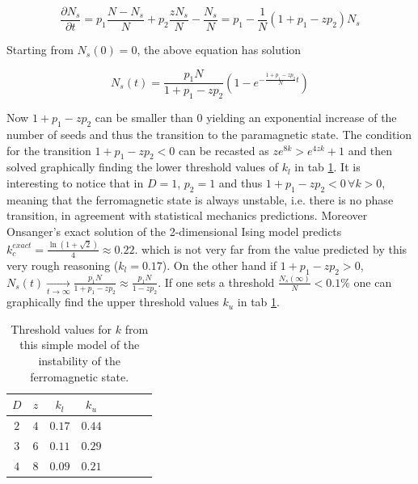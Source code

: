 \documentclass[a4paper, 11pt]{article}
\begin{document}
      \begin{equation*}
        \frac{\partial N_{s}}{\partial t} = p_1\frac{N - N_{s}}{N}  + p_2 \frac{zN_s}{N}- \frac{N_{s}}{N} = p_1 - \frac{1}{N}(1 + p_1 - zp_2) N_s
      \end{equation*}

      Starting from $N_s(0) = 0$, the above equation has solution

      \begin{equation*}
        N_{s}(t) = \frac{p_1N}{1 + p_1 - zp_2}\left(1 - e^{-\frac{1 + p_1 -zp_2}{N}t}  \right)
      \end{equation*}

      Now $1 + p_1 - zp_2$ can be smaller than 0 yielding an exponential increase of the number of seeds and thus the transition to the paramagnetic state. The condition for the transition $1 + p_1 - zp_2 < 0$ can be recasted as $ze^{8k} > e^{4zk} + 1$ and then solved graphically finding the lower threshold values of $k_l$ in tab \ref{tab:k_crit_th}.
      It is interesting to notice that in $D = 1$, $p_2 = 1$ and thus $1 + p_1 - zp_2 < 0 \, \forall k > 0$, meaning that the ferromagnetic state is always unstable, i.e. there is no phase transition, in agreement with statistical mechanics predictions. Moreover Onsanger's exact solution of the 2-dimensional Ising model predicts $k_{c}^{exact} = \frac{\ln(1 + \sqrt{2})}{4} \approx 0.22$. which is not very far from the value predicted by this very rough reasoning ($k_l = 0.17$).
      On the other hand if $1 + p_1 - zp_2 > 0$, $N_s(t) \xrightarrow[t \to \infty]{} \frac{p_1N}{1 + p_1 - zp_2} \approx \frac{p_1N}{1 - zp_2}$.
      If one sets a threshold $\frac{N_s(\infty)}{N} < 0.1\%$ one can graphically find the upper threshold values $k_u$ in tab \ref{tab:k_crit_th}.

      \begin{table}[H]
        \centering
        \begin{tabular}{cccccccc}
          \toprule
          $D$ & $z$ & $k_l$ & $k_u$ \\
          \midrule
          $2$ & $4$ & $0.17$ & $0.44$ \\
          $3$ & $6$ & $0.11$ & $0.29$ \\
          $4$ & $8$ & $0.09$ & $0.21$ \\
          \bottomrule
        \end{tabular}
        \caption{Threshold values for $k$ from this simple model of the instability of the ferromagnetic state.}
        \label{tab:k_crit_th}
      \end{table}
\end{document}
